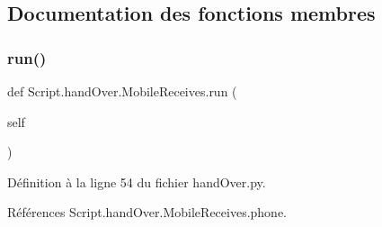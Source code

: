 \subsection{Documentation des fonctions membres}
\mbox{\label{classScript_1_1handOver_1_1MobileReceives_a340893dfd7b7d84b3282bd0c24044e37}} 
\subsubsection{\texorpdfstring{run()}{run()}}
{\footnotesize\ttfamily def Script.\+hand\+Over.\+Mobile\+Receives.\+run (\begin{DoxyParamCaption}\item[{}]{self }\end{DoxyParamCaption})}



Définition à la ligne 54 du fichier hand\+Over.\+py.



Références Script.\+hand\+Over.\+Mobile\+Receives.\+phone.


